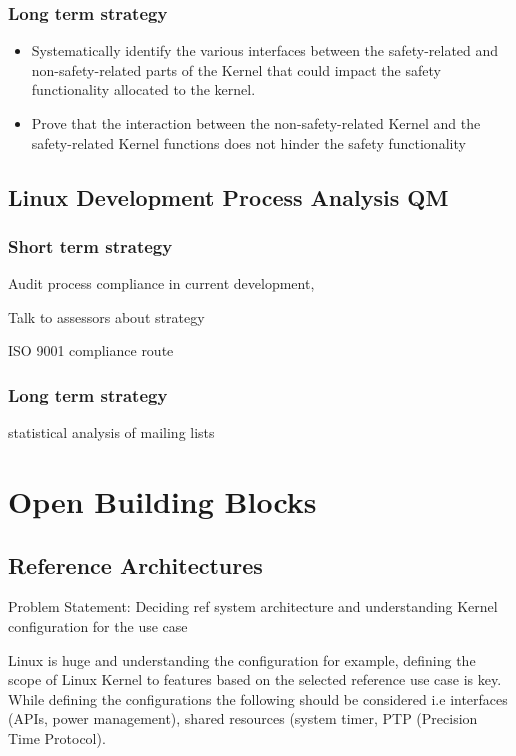 \documentclass[12pt]{../Common_files/ElisaPaper}
\begin{document}
\subsubsection{Long term strategy}
\begin{itemize}
\item	Systematically identify the various interfaces between the safety-related and non-safety-related parts of the Kernel that could impact the safety functionality allocated to the kernel.
\item	Prove that the interaction between the non-safety-related Kernel and the safety-related Kernel functions does not hinder the safety functionality
\end{itemize}

\subsection{Linux Development Process Analysis QM}

\subsubsection{Short term strategy}
Audit process compliance in current development, 

Talk to assessors about strategy

ISO 9001 compliance route

\subsubsection{Long term strategy}
statistical analysis of mailing lists




\section{Open Building Blocks}

\subsection{Reference Architectures}
Problem Statement: Deciding ref system architecture and understanding Kernel configuration for the use case

Linux is huge and understanding the configuration for example, defining the scope of Linux Kernel to features based on the selected reference use case is key. 
While defining the configurations the following should be considered i.e interfaces (APIs, power management), shared resources (system timer, PTP (Precision Time Protocol). 
\end{document}

